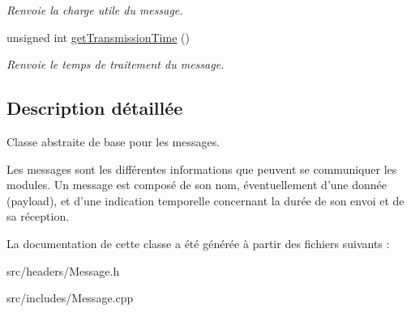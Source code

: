 \begin{DoxyCompactItemize}
\begin{DoxyCompactList}\small\item\em Renvoie la charge utile du message. \end{DoxyCompactList}\item 
\hypertarget{classMessage_aceef88a46eac676eb977e48cf5c3e464}{unsigned int \hyperlink{classMessage_aceef88a46eac676eb977e48cf5c3e464}{get\-Transmission\-Time} ()}\label{classMessage_aceef88a46eac676eb977e48cf5c3e464}

\begin{DoxyCompactList}\small\item\em Renvoie le temps de traitement du message. \end{DoxyCompactList}\end{DoxyCompactItemize}


\subsection{Description détaillée}
Classe abstraite de base pour les messages. 

Les messages sont les différentes informations que peuvent se communiquer les modules. Un message est composé de son nom, éventuellement d'une donnée (payload), et d'une indication temporelle concernant la durée de son envoi et de sa réception. 

La documentation de cette classe a été générée à partir des fichiers suivants \-:\begin{DoxyCompactItemize}
\item 
src/headers/Message.\-h\item 
src/includes/Message.\-cpp\end{DoxyCompactItemize}
